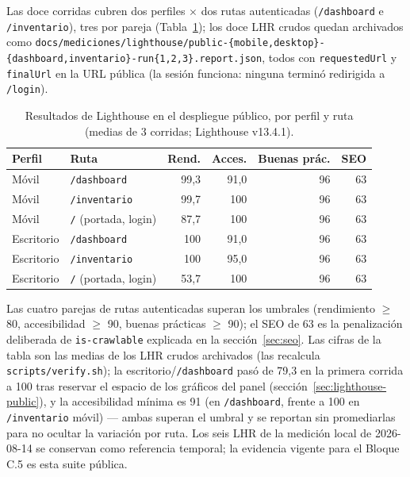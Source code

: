\documentclass[11pt,a4paper]{article}
\begin{document}
Las doce corridas cubren dos perfiles $\times$ dos rutas autenticadas
(\texttt{/dashboard} e \texttt{/inventario}), tres por pareja
(Tabla~\ref{tab:lighthouse-public}); los doce LHR crudos quedan
archivados como \texttt{docs/mediciones/lighthouse/public-\{mobile,desktop\}-\{dashboard,inventario\}-run\{1,2,3\}.report.json},
todos con \texttt{requestedUrl} y \texttt{finalUrl} en la URL pública
(la sesión funciona: ninguna terminó redirigida a \texttt{/login}).

\begin{table}[htbp]
\centering
\caption{Resultados de Lighthouse en el despliegue público, por perfil y ruta (medias de 3 corridas; Lighthouse v13.4.1).}
\label{tab:lighthouse-public}
\begin{tabular}{@{}llrrrr@{}}
\toprule
\textbf{Perfil} & \textbf{Ruta} & \textbf{Rend.} & \textbf{Acces.} & \textbf{Buenas prác.} & \textbf{SEO} \\
\midrule
Móvil & \texttt{/dashboard}  & 99,3 & 91,0 & 96 & 63 \\
Móvil & \texttt{/inventario} & 99,7 & 100 & 96 & 63 \\
Móvil & \texttt{/} (portada, login) & 87,7 & 100 & 96 & 63 \\
Escritorio & \texttt{/dashboard}  & 100 & 91,0 & 96 & 63 \\
Escritorio & \texttt{/inventario} & 100 & 95,0 & 96 & 63 \\
Escritorio & \texttt{/} (portada, login) & 53,7 & 100 & 96 & 63 \\
\bottomrule
\end{tabular}
\end{table}

Las cuatro parejas de rutas autenticadas superan los umbrales
(rendimiento $\geq$ 80, accesibilidad $\geq$ 90, buenas prácticas
$\geq$ 90); el SEO de 63 es
la penalización deliberada de \texttt{is-crawlable} explicada en la
sección~\ref{sec:seo}. Las cifras de la tabla son las medias de los LHR crudos
archivados (las recalcula \texttt{scripts/verify.sh}); la escritorio/\texttt{/dashboard}
pasó de 79,3 en la primera corrida a 100 tras reservar el espacio de los
gráficos del panel (sección~\ref{sec:lighthouse-public}), y la
accesibilidad mínima es 91 (en \texttt{/dashboard}, frente a 100 en
\texttt{/inventario} móvil) — ambas superan el umbral y se reportan sin
promediarlas para no ocultar la variación por ruta. Los seis LHR de la
medición local de 2026-08-14 se conservan como referencia temporal; la
evidencia vigente para el Bloque C.5 es esta suite pública.
\end{document}

